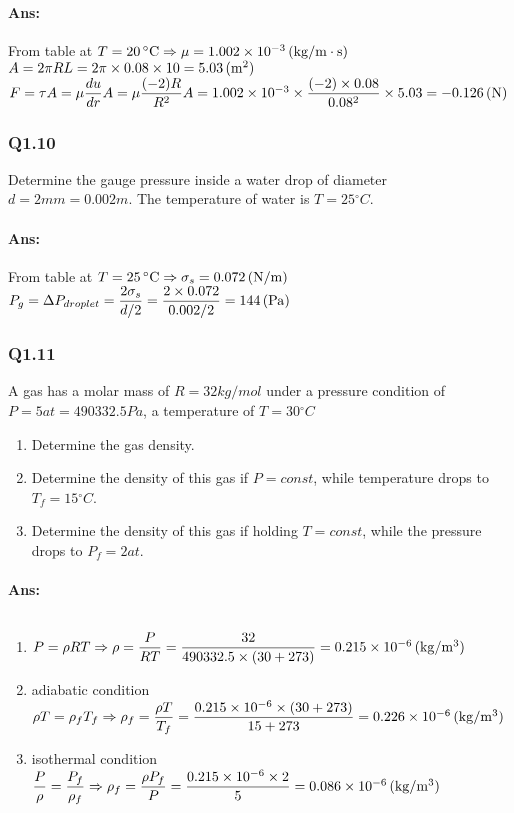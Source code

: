 \paragraph{Ans:}$ $\\
From table at $T= 20\, \mathrm{^\circ C} \Rightarrow \mu = 1.002\times10^{-3}\, (\mathrm{kg/m\cdot s})$\\
$ A = 2\pi R L = 2\pi\times 0.08\times 10 = 5.03\, (\mathrm{m^2})$\\
$F = \tau A = \mu \dfrac{du}{dr} A = \mu \dfrac{(-2)R}{R^2} A \\=1.002\times10^{-3} \times \dfrac{(-2)\times0.08}{0.08^2}\times 5.03 = -0.126\, (\mathrm{N})$

\subsubsection{Q1.10}
Determine the gauge pressure inside a water drop of diameter $ d = 2\unit{mm}=0.002\unit{m}$. The temperature of water is $ T=25\unit{^\circ C} $.
\paragraph{Ans:}$ $\\
From table at $T= 25\, \mathrm{^\circ C} \Rightarrow \sigma_s = 0.072\, (\mathrm{N/m})$\\
$ P_g= \Delta P_{droplet} = \dfrac{2\sigma_s}{d/2} = \dfrac{2\times0.072}{0.002/2}=144\, (\mathrm{Pa})$

\subsubsection{Q1.11}
A gas has a molar mass of $R= 32 \unit{kg/mol} $ under a pressure condition of $ P=5 \unit{at}=490332.5\unit{Pa} $, a temperature of $ T=30\unit{^\circ C} $
\begin{enumerate}
	\item Determine the gas density.
	\item Determine the density of this gas if $ P = const $, while temperature drops to $ T_f=15\unit{^\circ C} $.
	\item Determine the density of this gas if holding $ T = const $, while the pressure drops to $ P_f = 2 \unit{at} $.
\end{enumerate}
\paragraph{Ans:}$ $
\begin{enumerate}
	\item $ P=\rho R T\Rightarrow\rho = \dfrac{P}{RT}=\dfrac{32}{490332.5\times(30+273)} = 0.215\times10^{-6}\, (\mathrm{kg/m^3}) $
	\item adiabatic condition\\ $  \rho T = \rho_f T_f \Rightarrow \rho_f = \dfrac{\rho T}{T_f} = \dfrac{0.215\times10^{-6}\times(30+273)}{15+273}=0.226\times10^{-6}\, (\mathrm{kg/m^3})$
	\item isothermal condition\\ $  \dfrac{P}{\rho}=\dfrac{P_f}{\rho_f}\Rightarrow\rho_f = \dfrac{\rho P_f}{P} = \dfrac{0.215\times10^{-6}\times2}{5}=0.086\times10^{-6}\, (\mathrm{kg/m^3})$ 
\end{enumerate}
